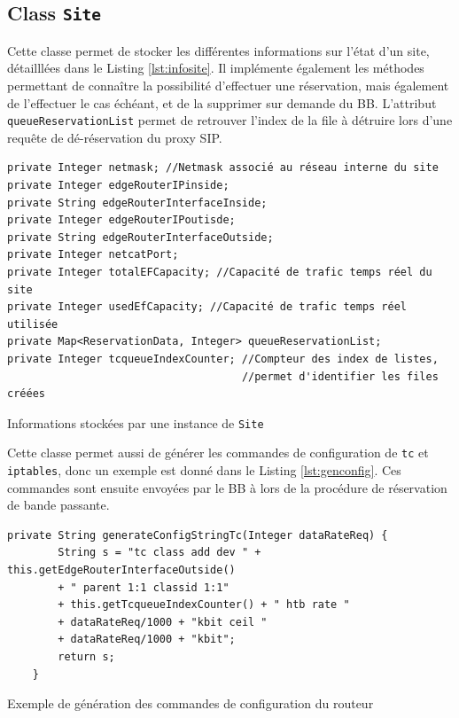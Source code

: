 \documentclass[a4paper,11pt]{article}
\let\Oldsubsection\subsection
\renewcommand{\subsection}{\FloatBarrier\Oldsubsection}
\begin{document}
\subsection{Class \texttt{Site}}

Cette classe permet de stocker les différentes informations sur l'état d'un site, détailllées dans le Listing \ref{lst:infosite}.
Il implémente également les méthodes permettant de connaître la possibilité d'effectuer une réservation, mais également de l'effectuer le cas échéant, et de la  supprimer sur demande du BB.
L'attribut \texttt{queueReservationList} permet de retrouver l'index de la file à détruire lors d'une requête de dé-réservation du proxy SIP.

\begin{listing}[htp]
    \begin{verbatim}
private Integer netmask; //Netmask associé au réseau interne du site
private Integer edgeRouterIPinside;
private String edgeRouterInterfaceInside;
private Integer edgeRouterIPoutisde;
private String edgeRouterInterfaceOutside;
private Integer netcatPort;
private Integer totalEFCapacity; //Capacité de trafic temps réel du site
private Integer usedEfCapacity; //Capacité de trafic temps réel utilisée 
private Map<ReservationData, Integer> queueReservationList;
private Integer tcqueueIndexCounter; //Compteur des index de listes, 
                                     //permet d'identifier les files créées
    \end{verbatim}
    \caption{Informations stockées par une instance de \texttt{Site}}
    \label{lst:infosite}
\end{listing}

Cette classe permet aussi de générer les commandes de configuration de \texttt{tc} et \texttt{iptables}, donc un exemple est donné dans le Listing \ref{lst:genconfig}. Ces commandes sont ensuite envoyées par le BB à lors de la procédure de réservation de bande passante.

\begin{listing}[htp]
    \begin{verbatim}
private String generateConfigStringTc(Integer dataRateReq) {
        String s = "tc class add dev " + this.getEdgeRouterInterfaceOutside() 
        + " parent 1:1 classid 1:1"
        + this.getTcqueueIndexCounter() + " htb rate " 
        + dataRateReq/1000 + "kbit ceil " 
        + dataRateReq/1000 + "kbit";
        return s;
    }

    \end{verbatim}
    \caption{Exemple de génération des commandes de configuration du routeur}
    \label{lst:genconfig}
\end{listing}
\end{document}
